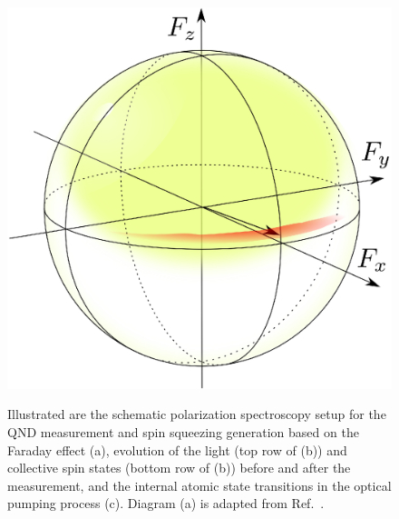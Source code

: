 \documentclass[aps,pra,twocolumn,superscriptaddress]{revtex4-1} %
\begin{document}
\begin{figure}[t]
{\begin{minipage}[bt]{.5\textwidth}
    \label{fig:blochsphere_initialxFxyz_crystal_orange}
   \hfill
      \centering
      \includegraphics[width=.44\textwidth]{fig/blochsphere_initialxFxyz_squeezed_crystal_orange}
      \label{fig:blochsphere_initialxFxyz_squeezed_crystal_orange}
  \end{minipage}}\hfill
  \caption{Illustrated are the schematic polarization spectroscopy setup for the QND measurement and spin squeezing generation based on the Faraday effect (a), evolution of the light (top row of (b)) and collective spin states (bottom row of (b)) before and after the measurement, and the internal atomic state transitions in the optical pumping process (c). Diagram (a) is adapted from Ref.~\cite{Qi2016}.}\label{fig:spinsqueezingschematic}
\end{figure}
\twocolumngrid
\end{document}
